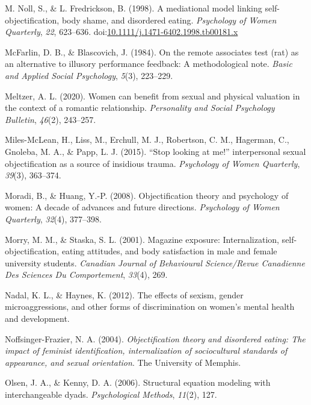 \documentclass[man]{apa6}
\begin{document}
\hypertarget{ref-nollfredrickson1998}{}
M. Noll, S., \& L. Fredrickson, B. (1998). A mediational model linking
self-objectification, body shame, and disordered eating.
\emph{Psychology of Women Quarterly}, \emph{22}, 623--636.
doi:\href{https://doi.org/10.1111/j.1471-6402.1998.tb00181.x}{10.1111/j.1471-6402.1998.tb00181.x}

\hypertarget{ref-mcfarlin1984remote}{}
McFarlin, D. B., \& Blascovich, J. (1984). On the remote associates test
(rat) as an alternative to illusory performance feedback: A
methodological note. \emph{Basic and Applied Social Psychology},
\emph{5}(3), 223--229.

\hypertarget{ref-meltzer2020women}{}
Meltzer, A. L. (2020). Women can benefit from sexual and physical
valuation in the context of a romantic relationship. \emph{Personality
and Social Psychology Bulletin}, \emph{46}(2), 243--257.

\hypertarget{ref-miles2015stop}{}
Miles-McLean, H., Liss, M., Erchull, M. J., Robertson, C. M., Hagerman,
C., Gnoleba, M. A., \& Papp, L. J. (2015). ``Stop looking at me!''
interpersonal sexual objectification as a source of insidious trauma.
\emph{Psychology of Women Quarterly}, \emph{39}(3), 363--374.

\hypertarget{ref-moradi2008}{}
Moradi, B., \& Huang, Y.-P. (2008). Objectification theory and
psychology of women: A decade of advances and future directions.
\emph{Psychology of Women Quarterly}, \emph{32}(4), 377--398.

\hypertarget{ref-morry2001magazine}{}
Morry, M. M., \& Staska, S. L. (2001). Magazine exposure:
Internalization, self-objectification, eating attitudes, and body
satisfaction in male and female university students. \emph{Canadian
Journal of Behavioural Science/Revue Canadienne Des Sciences Du
Comportement}, \emph{33}(4), 269.

\hypertarget{ref-nadal2012effects}{}
Nadal, K. L., \& Haynes, K. (2012). The effects of sexism, gender
microaggressions, and other forms of discrimination on women's mental
health and development.

\hypertarget{ref-noffsinger2004objectification}{}
Noffsinger-Frazier, N. A. (2004). \emph{Objectification theory and
disordered eating: The impact of feminist identification,
internalization of sociocultural standards of appearance, and sexual
orientation}. The University of Memphis.

\hypertarget{ref-olsen2006structural}{}
Olsen, J. A., \& Kenny, D. A. (2006). Structural equation modeling with
interchangeable dyads. \emph{Psychological Methods}, \emph{11}(2), 127.
\end{document}
